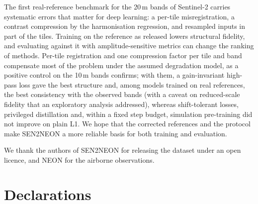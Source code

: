 \documentclass[pdflatex,sn-basic,referee,lineno]{sn-jnl}
\begin{document}
The first real-reference benchmark for the 20\,m bands of Sentinel-2 carries systematic errors that matter for deep
learning: a per-tile misregistration, a contrast compression by the harmonisation regression, and resampled inputs
in part of the tiles. Training on the reference as released lowers structural fidelity, and evaluating against it
with amplitude-sensitive metrics can change the ranking of methods. Per-tile registration and one compression
factor per tile and band compensate most of the problem under the assumed degradation model, as a positive control
on the 10\,m bands confirms; with them, a gain-invariant high-pass loss gave the best structure and, among models trained on real references, the best consistency
with the observed bands (with a caveat on reduced-scale fidelity that an exploratory analysis addressed), whereas shift-tolerant losses,
privileged distillation and, within a fixed step budget, simulation pre-training did not improve on plain L1. We hope that the
corrected references and the protocol make SEN2NEON a more reliable basis for both training and evaluation.

\backmatter

We thank the authors of SEN2NEON for releasing the dataset under an open licence, and NEON for the airborne
observations.

\section*{Declarations}
\end{document}
